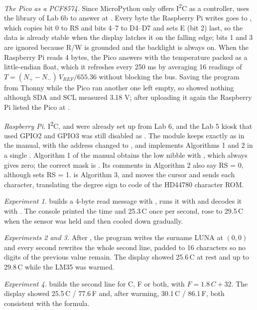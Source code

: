 \documentclass[12pt,letterpaper]{article}
\begin{document}
\emph{The Pico as a PCF8574.} Since MicroPython only offers I\textsuperscript{2}C as a controller,  uses the  library of Lab 6b to answer at . Every byte the Raspberry Pi writes goes to , which copies bit 0 to RS and bits 4--7 to D4--D7 and sets E (bit 2) last, so the data is already stable when the display latches it on the falling edge; bits 1 and 3 are ignored because R/W is grounded and the backlight is always on. When the Raspberry Pi reads 4 bytes, the Pico answers with the temperature packed as a little-endian float, which it refreshes every 250 ms by averaging 16 readings of $T=(N_{+}-N_{-})\,V_{REF}/655.36$ without blocking the bus. Saving the program from Thonny while the Pico ran another one left  empty, so  showed nothing although SDA and SCL measured 3.18 V; after uploading it again the Raspberry Pi listed the Pico at .

\emph{Raspberry Pi.} I\textsuperscript{2}C,  and  were already set up from Lab 6, and the Lab 5 kiosk that used GPIO2 and GPIO3 was still disabled as . The module  keeps  exactly as in the manual, with the address changed to , and implements Algorithms 1 and 2 in a single . Algorithm 1 of the manual obtains the low nibble with , which always gives zero; the correct mask is . Its comments in Algorithm 2 also say RS = 0, although  sets RS = 1.  is Algorithm 3, and  moves the cursor and sends each character, translating the degree sign to code  of the HD44780 character ROM.

\emph{Experiment 1.}  builds a 4-byte read message with , runs it with  and decodes it with . The console printed the time and 25.3\,\textdegree C once per second, rose to 29.5\,\textdegree C when the sensor was held and then cooled down gradually.

\emph{Experiments 2 and 3.} After , the program writes the surname LUNA at $(0,0)$ and every second rewrites the whole second line, padded to 16 characters so no digits of the previous value remain. The display showed 25.6\,\textdegree C at rest and up to 29.8\,\textdegree C while the LM35 was warmed.

\emph{Experiment 4.}  builds the second line for C, F or both, with $F = 1.8\,C + 32$. The display showed 25.5\,\textdegree C / 77.6\,\textdegree F and, after warming, 30.1\,\textdegree C / 86.1\,\textdegree F, both consistent with the formula.
\end{document}
